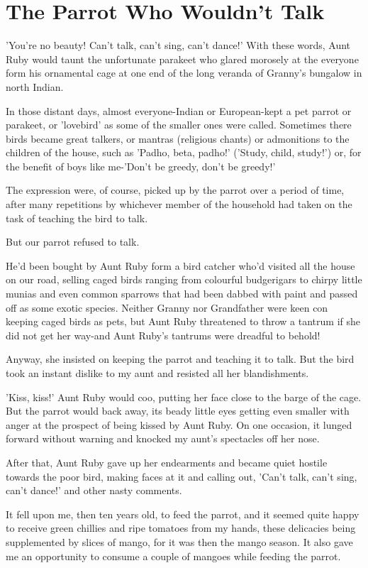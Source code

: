 \chapter{The Parrot Who Wouldn't Talk}
'You're no beauty! Can't talk, can't sing, can't dance!' With these words, Aunt Ruby would taunt the unfortunate parakeet who glared morosely at the everyone form his ornamental cage at one end of the long veranda of Granny's bungalow in north Indian.
\par
In those distant days, almost everyone-Indian or European-kept a pet parrot or parakeet, or 'lovebird' as some of the smaller ones were called. Sometimes there birds became great talkers, or mantras (religious chants) or admonitions to the children of the house, such as 'Padho, beta, padho!' ('Study, child, study!') or, for the benefit of boys like me-'Don't be greedy, don't be greedy!'
\par
The expression were, of course, picked up by the parrot over a period of time, after many repetitions by whichever member of the household had taken on the task of teaching the bird to talk.
\par
But our parrot refused to talk.
\par
He'd been bought by Aunt Ruby form a bird catcher who'd visited all the house on our road, selling caged birds ranging from colourful budgerigars to chirpy little munias and even common sparrows that had been dabbed with paint and passed off as some exotic species. Neither Granny nor Grandfather were keen con keeping caged birds as pets, but Aunt Ruby threatened to throw a tantrum if she did not get her way-and Aunt Ruby's tantrums were dreadful to behold!
\par
Anyway, she insisted on keeping the parrot and teaching it to talk. But the bird took an instant dislike to my aunt and resisted all her blandishments.
\par
'Kiss, kiss!' Aunt Ruby would coo, putting her face close to the barge of the cage. But the parrot would back away, its beady little eyes getting even smaller with anger at the prospect of being kissed by Aunt Ruby. On one occasion, it lunged forward without warning and knocked my aunt's spectacles off her nose.
\par
After that, Aunt Ruby gave up her endearments and became quiet hostile towards the poor bird, making faces at it and calling out, 'Can't talk, can't sing, can't dance!' and other nasty comments.
\par
It fell upon me, then ten years old, to feed the parrot, and it seemed quite happy to receive green chillies and ripe tomatoes from my hands, these delicacies being supplemented by slices of mango, for it was then the mango season. It also gave me an opportunity to consume a couple of mangoes while feeding the parrot.
